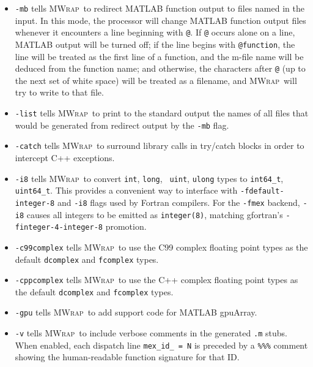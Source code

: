 \documentclass[12pt]{article}
\newcommand{\mwrap}{\textsc{MWrap}}
\begin{document}
\begin{itemize}
\item {\tt -mb} tells \mwrap\ to redirect MATLAB function output to
  files named in the input.  In this mode, the processor will change
  MATLAB function output files whenever it encounters a line
  beginning with \verb|@|.  If \verb|@| occurs alone on a line,
  MATLAB output will be turned off; if the line begins with \verb|@function|,
  the line will be treated as the first line of a function, and the m-file
  name will be deduced from the function name; and otherwise, the characters 
  after \verb|@| (up to the next set of white space) will be treated as a
  filename, and \mwrap\ will try to write to that file.

\item {\tt -list} tells \mwrap\ to print to the standard output the
  names of all files that would be generated from redirect output by
  the {\tt -mb} flag.

\item {\tt -catch} tells \mwrap\ to surround library calls in try/catch
  blocks in order to intercept C++ exceptions.

\item {\tt -i8} tells \mwrap\ to convert {\tt int}, {\tt long}, {\tt
  uint}, {\tt ulong} types to {\tt int64\_t}, {\tt uint64\_t}. This
  provides a convenient way to interface with {\tt -fdefault-integer-8}
  and {\tt -i8} flags used by Fortran compilers.
  For the {\tt -fmex} backend, {\tt -i8} causes all integers to be
  emitted as {\tt integer(8)}, matching gfortran's
  {\tt -finteger-4-integer-8} promotion.

\item {\tt -c99complex} tells \mwrap\ to use the C99 complex floating
  point types as the default {\tt dcomplex} and {\tt fcomplex} types.

\item {\tt -cppcomplex} tells \mwrap\ to use the C++ complex floating
  point types as the default {\tt dcomplex} and {\tt fcomplex} types.

\item {\tt -gpu} tells \mwrap\ to add support code for MATLAB gpuArray.

\item {\tt -v} tells \mwrap\ to include verbose comments in the
  generated {\tt .m} stubs.  When enabled, each dispatch line
  {\tt mex\_id\_ = N} is preceded by a {\tt \%\%\%} comment showing
  the human-readable function signature for that ID.

\end{itemize}
\end{document}
